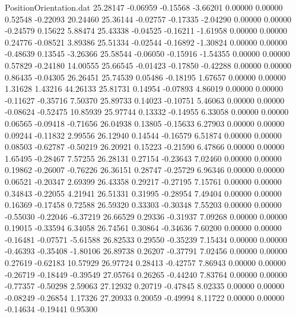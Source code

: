 \begin{filecontents}{PositionOrientation.dat}
  25.28147   -0.06959   -0.15568    -3.66201    0.00000    0.00000    0.52548   -0.22093   20.24460
  25.36144   -0.02757   -0.17335    -2.04290    0.00000    0.00000   -0.24579    0.15622    5.88474
  25.43338   -0.04525   -0.16211    -1.61958    0.00000    0.00000    0.24776   -0.08521    3.89386
  25.51334   -0.02544   -0.16892    -1.30824    0.00000    0.00000   -0.48639    0.13545   -3.26366
  25.58544   -0.06050   -0.15916    -1.54355    0.00000    0.00000    0.57829   -0.24180   14.00555
  25.66545   -0.01423   -0.17850    -0.42288    0.00000    0.00000    0.86435   -0.04305   26.26451
  25.74539    0.05486   -0.18195     1.67657    0.00000    0.00000    1.31628    1.43216   44.26133
  25.81731    0.14954   -0.07893     4.86019    0.00000    0.00000   -0.11627   -0.35716    7.50370
  25.89733    0.14023   -0.10751     5.46063    0.00000    0.00000   -0.08624   -0.52475   10.85939
  25.97744    0.13332   -0.14955     6.33058    0.00000    0.00000    0.06565   -0.09418   -0.71656
  26.04938    0.13805   -0.15633     6.27903    0.00000    0.00000    0.09244   -0.11832    2.99556
  26.12940    0.14544   -0.16579     6.51874    0.00000    0.00000    0.08503   -0.62787   -0.50219
  26.20921    0.15223   -0.21590     6.47866    0.00000    0.00000    1.65495   -0.28467    7.57255
  26.28131    0.27154   -0.23643     7.02460    0.00000    0.00000    0.19862   -0.26007   -0.76226
  26.36151    0.28747   -0.25729     6.96346    0.00000    0.00000    0.06521   -0.20347    2.69399
  26.43358    0.29217   -0.27195     7.15761    0.00000    0.00000    0.34843   -0.22055    4.21941
  26.51331    0.31995   -0.28954     7.49404    0.00000    0.00000    0.16369   -0.17458    0.72588
  26.59320    0.33303   -0.30348     7.55203    0.00000    0.00000   -0.55030   -0.22046   -6.37219
  26.66529    0.29336   -0.31937     7.09268    0.00000    0.00000    0.19015   -0.33594    6.34058
  26.74561    0.30864   -0.34636     7.60200    0.00000    0.00000   -0.16481   -0.07571   -5.61588
  26.82533    0.29550   -0.35239     7.15434    0.00000    0.00000   -0.46393   -0.35408   -1.80106
  26.89738    0.26207   -0.37791     7.02456    0.00000    0.00000    0.27619   -0.62183   10.57929
  26.97724    0.28413   -0.42757     7.86943    0.00000    0.00000   -0.26719   -0.18449   -0.39549
  27.05764    0.26265   -0.44240     7.83764    0.00000    0.00000   -0.77357   -0.50298    2.59063
  27.12932    0.20719   -0.47845     8.02335    0.00000    0.00000   -0.08249   -0.26854    1.17326
  27.20933    0.20059   -0.49994     8.11722    0.00000    0.00000   -0.14634   -0.19441    0.95300

\end{filecontents}
